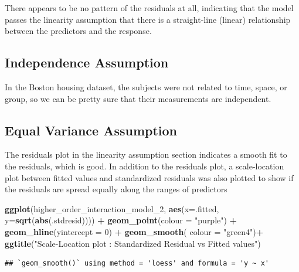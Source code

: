 \documentclass[
]{article}
\newenvironment{Shaded}{\begin{snugshade}}{\end{snugshade}}
\newcommand{\AttributeTok}[1]{\textcolor[rgb]{0.13,0.29,0.53}{#1}}
\newcommand{\DecValTok}[1]{\textcolor[rgb]{0.00,0.00,0.81}{#1}}
\newcommand{\FunctionTok}[1]{\textcolor[rgb]{0.13,0.29,0.53}{\textbf{#1}}}
\newcommand{\NormalTok}[1]{#1}
\newcommand{\SpecialCharTok}[1]{\textcolor[rgb]{0.81,0.36,0.00}{\textbf{#1}}}
\newcommand{\StringTok}[1]{\textcolor[rgb]{0.31,0.60,0.02}{#1}}
\begin{document}
There appears to be no pattern of the residuals at all, indicating that
the model passes the linearity assumption that there is a straight-line
(linear) relationship between the predictors and the response.

\subsection{Independence Assumption}\label{independence-assumption}

In the Boston housing dataset, the subjects were not related to time,
space, or group, so we can be pretty sure that their measurements are
independent.

\subsection{Equal Variance Assumption}\label{equal-variance-assumption}

The residuals plot in the linearity assumption section indicates a
smooth fit to the residuals, which is good. In addition to the residuals
plot, a scale-location plot between fitted values and standardized
residuals was also plotted to show if the residuals are spread equally
along the ranges of predictors

\begin{Shaded}
\begin{Highlighting}[]
\FunctionTok{ggplot}\NormalTok{(higher\_order\_interaction\_model\_2, }\FunctionTok{aes}\NormalTok{(}\AttributeTok{x=}\NormalTok{.fitted, }\AttributeTok{y=}\FunctionTok{sqrt}\NormalTok{(}\FunctionTok{abs}\NormalTok{(.stdresid)))) }\SpecialCharTok{+}
\FunctionTok{geom\_point}\NormalTok{(}\AttributeTok{colour =} \StringTok{"purple"}\NormalTok{) }\SpecialCharTok{+}
\FunctionTok{geom\_hline}\NormalTok{(}\AttributeTok{yintercept =} \DecValTok{0}\NormalTok{) }\SpecialCharTok{+}
\FunctionTok{geom\_smooth}\NormalTok{( }\AttributeTok{colour =} \StringTok{"green4"}\NormalTok{)}\SpecialCharTok{+}
\FunctionTok{ggtitle}\NormalTok{(}\StringTok{"Scale{-}Location plot : Standardized Residual vs Fitted values"}\NormalTok{)}
\end{Highlighting}
\end{Shaded}

\begin{verbatim}
## `geom_smooth()` using method = 'loess' and formula = 'y ~ x'
\end{verbatim}
\end{document}
